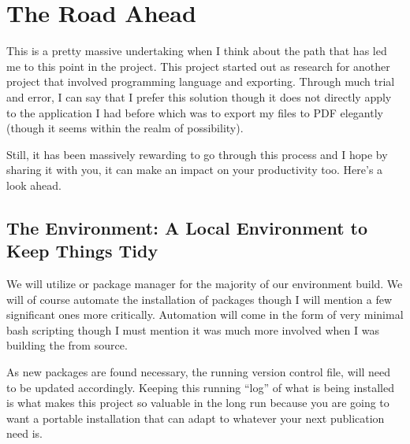 \documentclass[letterpaper,12pt,english]{sphinxmanual}
\begin{document}
\section{The Road Ahead}
\label{\detokenize{_notebooks/00-the-goal:the-road-ahead}}
\sphinxAtStartPar
This is a pretty massive undertaking when I think about the path that has led me to this point in the project. This project started out as research for another project that involved  programming language and  exporting. Through much trial and error, I can say that I prefer this solution though it does not directly apply to the application I had before which was to export my  files to PDF elegantly (though it seems within the realm of possibility).

\sphinxAtStartPar
Still, it has been massively rewarding to go through this process and I hope by sharing it with you, it can make an impact on your productivity too. Here’s a look ahead.


\subsection{The Environment: A Local  Environment to Keep Things Tidy}
\label{\detokenize{_notebooks/00-the-goal:the-environment-a-local-conda-environment-to-keep-things-tidy}}
\sphinxAtStartPar
We will utilize  or  package manager  for the majority of our environment build. We will of course automate the installation of packages though I will mention a few significant ones more critically. Automation will come in the form of very minimal bash scripting \textendash{}though I must mention it was much more involved when I was building the  from source.

\sphinxAtStartPar
As new packages are found necessary, the running version control file,  will need to be updated accordingly. Keeping this running “log” of what is being installed is what makes this project so valuable in the long run because you are going to want a portable installation that can adapt to whatever your next publication need is.
\end{document}
